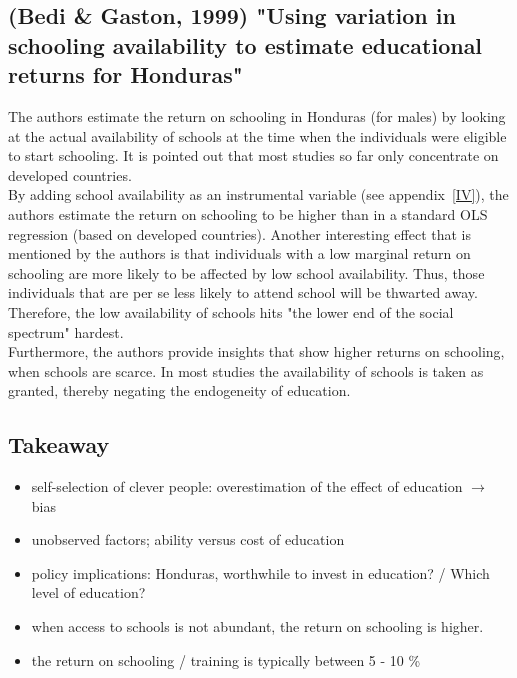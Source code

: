 \documentclass[12pt,a4paper]{article}
\begin{document}
  \subsection{(Bedi \& Gaston, 1999) "Using variation in schooling availability to estimate educational returns for Honduras"} %
  \label{sub:bedi}
  The authors estimate the return on schooling in Honduras (for males) by looking at the actual availability of schools at the
  time when the individuals were eligible to start schooling. It is pointed out that most studies so far only concentrate
  on developed countries.\\
  By adding school availability as an instrumental variable (see appendix~\ref{IV}), the authors estimate the return
  on schooling to be higher than in a standard OLS regression (based on developed countries). Another interesting effect
  that is mentioned by the authors is that individuals with a low marginal return on schooling are more likely to
  be affected by low school availability. Thus, those individuals that are per se less likely to attend school will
  be thwarted away. Therefore, the low availability of schools hits "the lower end of the social spectrum" hardest.\\
  Furthermore, the authors provide insights that show higher returns on schooling, when schools are scarce. In most
  studies the availability of schools is taken as granted, thereby negating the endogeneity of education.\\

  \subsection{Takeaway} %
    \begin{itemize}
      \item self-selection of clever people: overestimation of the effect of education $\rightarrow$
        bias
      \item unobserved factors; ability versus cost of education
      \item policy implications: Honduras, worthwhile to invest in education? / Which level of
        education?
      \item when access to schools is not abundant, the return on schooling is higher.
      \item the return on schooling / training is typically between 5 - 10 \%
    \end{itemize}
  
\end{document}
